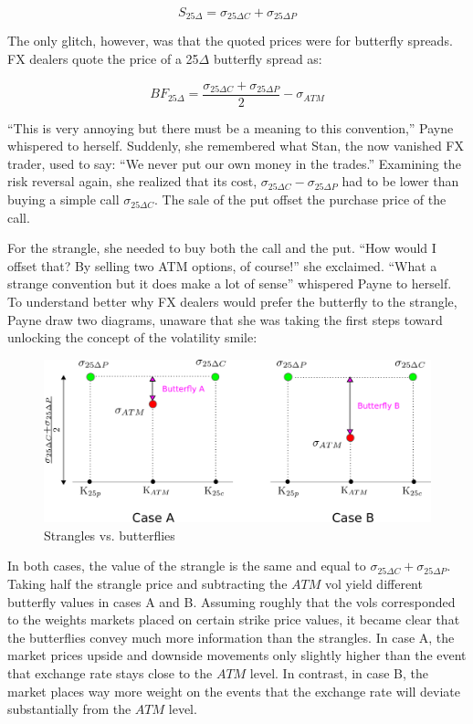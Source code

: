 \documentclass[]{book}
\theoremstyle{definition}
\theoremstyle{definition}
\theoremstyle{definition}
\theoremstyle{remark}
\begin{document}
\[
S_{25\Delta} = \sigma_{25\Delta C} + \sigma_{25\Delta P}
\]

The only glitch, however, was that the quoted prices were for butterfly
spreads. FX dealers quote the price of a 25\(\Delta\) butterfly spread
as:

\[
BF_{25\Delta} = \frac{\sigma_{25\Delta C} + \sigma_{25\Delta P}}{2}  - \sigma_{ATM}
\]

``This is very annoying but there must be a meaning to this
convention,'' Payne whispered to herself. Suddenly, she remembered what
Stan, the now vanished FX trader, used to say: ``We never put our own
money in the trades.'' Examining the risk reversal again, she realized
that its cost, \(\sigma_{25\Delta C} - \sigma_{25\Delta P}\) had to be
lower than buying a simple call \(\sigma_{25\Delta C}\). The sale of the
put offset the purchase price of the call.

For the strangle, she needed to buy both the call and the put. ``How
would I offset that? By selling two ATM options, of course!'' she
exclaimed. ``What a strange convention but it does make a lot of sense''
whispered Payne to herself. To understand better why FX dealers would
prefer the butterfly to the strangle, Payne draw two diagrams, unaware
that she was taking the first steps toward unlocking the concept of the
volatility smile:

\begin{figure}
\includegraphics[width=1\linewidth]{images/figStrangleButterfly} \caption{Strangles vs. butterflies}\label{fig:unnamed-chunk-18}
\end{figure}

In both cases, the value of the strangle is the same and equal to
\(\sigma_{25\Delta C} + \sigma_{25\Delta P}\). Taking half the strangle
price and subtracting the \(ATM\) vol yield different butterfly values
in cases A and B. Assuming roughly that the vols corresponded to the
weights markets placed on certain strike price values, it became clear
that the butterflies convey much more information than the strangles. In
case A, the market prices upside and downside movements only slightly
higher than the event that exchange rate stays close to the \(ATM\)
level. In contrast, in case B, the market places way more weight on the
events that the exchange rate will deviate substantially from the
\(ATM\) level.
\end{document}
